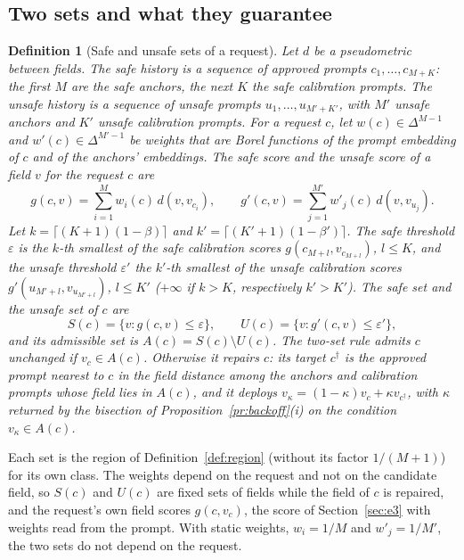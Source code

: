 \documentclass{article}
\theoremstyle{plain}
\newtheorem{definition}[theorem]{Definition}
\theoremstyle{remark}
\begin{document}
\subsection{Two sets and what they guarantee}\label{sec:e3u_theory}

\begin{definition}[Safe and unsafe sets of a request]\label{def:two_sets}
Let $d$ be a pseudometric between fields. The \emph{safe history} is a sequence of approved prompts $c_1,\dots,c_{M+K}$: the first $M$
are the \emph{safe anchors}, the next $K$ the \emph{safe calibration prompts}. The \emph{unsafe history} is a sequence of unsafe
prompts $u_1,\dots,u_{M'+K'}$, with $M'$ \emph{unsafe anchors} and $K'$ \emph{unsafe calibration prompts}. For a request $c$, let
$w(c)\in\Delta^{M-1}$ and $w'(c)\in\Delta^{M'-1}$ be weights that are Borel functions of the prompt embedding of $c$ and of the
anchors' embeddings. The \emph{safe score} and the \emph{unsafe score} of a field $v$ for the request $c$ are
\[
g(c,v)=\sum_{i=1}^Mw_i(c)\,d(v,v_{c_i}),\qquad g'(c,v)=\sum_{j=1}^{M'}w'_j(c)\,d(v,v_{u_j}).
\]
Let $k=\lceil(K+1)(1-\beta)\rceil$ and $k'=\lceil(K'+1)(1-\beta')\rceil$. The \emph{safe threshold} $\varepsilon$ is the $k$-th smallest
of the safe calibration scores $g(c_{M+l},v_{c_{M+l}})$, $l\le K$, and the \emph{unsafe threshold} $\varepsilon'$ the $k'$-th smallest of
the unsafe calibration scores $g'(u_{M'+l},v_{u_{M'+l}})$, $l\le K'$ ($+\infty$ if $k>K$, respectively $k'>K'$). The \emph{safe set} and
the \emph{unsafe set} of $c$ are
\[
S(c)=\{v:g(c,v)\le\varepsilon\},\qquad U(c)=\{v:g'(c,v)\le\varepsilon'\},
\]
and its \emph{admissible set} is $A(c)=S(c)\setminus U(c)$. The \emph{two-set rule} admits $c$ unchanged if $v_c\in A(c)$. Otherwise it
\emph{repairs} $c$: its \emph{target} $c^\dagger$ is the approved prompt nearest to $c$ in the field distance among the anchors and
calibration prompts whose field lies in $A(c)$, and it deploys $v_\kappa=(1-\kappa)v_c+\kappa v_{c^\dagger}$, with $\kappa$ returned by the
bisection of Proposition~\ref{pr:backoff}(i) on the condition $v_\kappa\in A(c)$.
\end{definition}

Each set is the region of Definition~\ref{def:region} (without its factor $1/(M+1)$) for its own class. The weights depend on the request
and not on the candidate field, so $S(c)$ and $U(c)$ are fixed sets of fields while the field of $c$ is repaired, and the request's own
field scores $g(c,v_c)$, the score of Section~\ref{sec:e3} with weights read from the prompt. With static weights, $w_i=1/M$ and
$w'_j=1/M'$, the two sets do not depend on the request.
\end{document}
